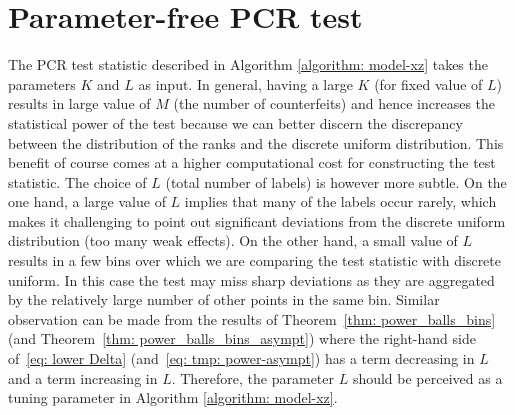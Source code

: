 \documentclass[11pt]{article}
\newtheorem{defi}[propo]{Definition}
\begin{document}




\iffalse
Figure \ref{fig: theoretical_power} compares  empirical power and theoretical power obtained from equation~\eqref{eq: lambda}.
\begin{figure}
    \centering
    \texttt{[image: emp-theory.pdf]}
    \caption{Comparison of empirical and theoretical power obtained from~\eqref{eq: lambda} for different $Q$ measures and $m$ values. Settings are similar to Figure \ref{fig: power}.} 
    \label{fig: theoretical_power}
\end{figure}
\fi

\section{Parameter-free PCR test }\label{sec:pf}
The PCR test statistic described in Algorithm \ref{algorithm: model-xz} takes the parameters $K$ and $L$ as input. In general, having a large $K$ (for fixed value of $L$) results in large value of $M$ (the number of counterfeits) and hence increases the statistical power of the test because we can better discern the discrepancy between the distribution of the ranks and the discrete uniform distribution. This benefit of course comes at a higher computational cost for constructing the test statistic. The choice of $L$  (total number of labels) is however more subtle. On the one hand, a large value of $L$ implies that many of the labels occur rarely, which makes it challenging to point out significant deviations from the discrete uniform distribution (too many weak effects). On the other hand, a small value of $L$ results in a few bins over which we are comparing the test statistic with discrete uniform. In this case the test may miss sharp deviations as they are aggregated by the relatively large number of other points in the same bin. Similar observation can be made from the results of Theorem~\ref{thm: power_balls_bins} (and Theorem~\ref{thm: power_balls_bins_asympt}) where the right-hand side of~\eqref{eq: lower Delta} (and~\eqref{eq: tmp: power-asympt}) has a term decreasing in $L$ and a term increasing in $L$. Therefore, the parameter $L$ should be perceived as a tuning parameter in Algorithm \ref{algorithm: model-xz}.  
\end{document}
